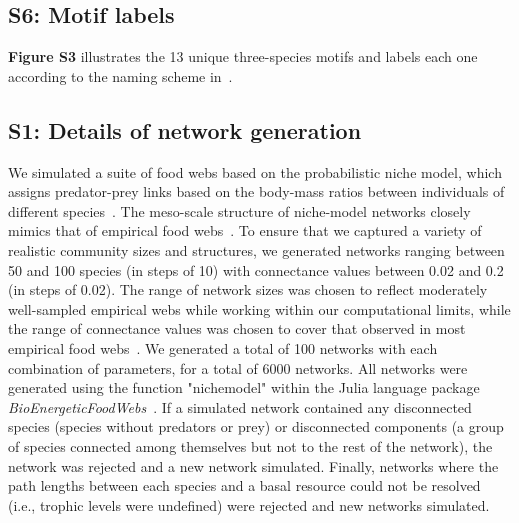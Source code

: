 \documentclass[12pt]{article}
\begin{document}
    \subsection*{S6: Motif labels}
        
        \textbf{Figure S3} illustrates the 13 unique three-species motifs and labels each one according to the naming scheme in~\citet{Stouffer2007}.

\clearpage
\begin{spacing}{2.0}
\linenumbers
\section*{S1: Details of network generation}


	We simulated a suite of food webs based on the probabilistic niche model, which assigns predator-prey links based on the body-mass ratios between individuals of different species~\citep{Williams2000,Delmas2017}. The meso-scale structure of niche-model networks closely mimics that of empirical food webs~\citep{Stouffer2007}. To ensure that we captured a variety of realistic community sizes and structures, we generated networks ranging between 50 and 100 species (in steps of 10) with connectance values between 0.02 and 0.2 (in steps of 0.02). The range of network sizes was chosen to reflect moderately well-sampled empirical webs while working within our computational limits, while the range of connectance values was chosen to cover that observed in most empirical food webs~\citep{Dunne2002e}. We generated a total of 100 networks with each combination of parameters, for a total of 6000 networks. All networks were generated using the function "nichemodel" within the Julia language package \emph{BioEnergeticFoodWebs}~\citep{bioenergeticfw,Delmas2017}. If a simulated network contained any disconnected species (species without predators or prey) or disconnected components (a group of species connected among themselves but not to the rest of the network), the network was rejected and a new network simulated. Finally, networks where the path lengths between each species and a basal resource could not be resolved (i.e., trophic levels were undefined) were rejected and new networks simulated.



\end{spacing}
\end{document}
